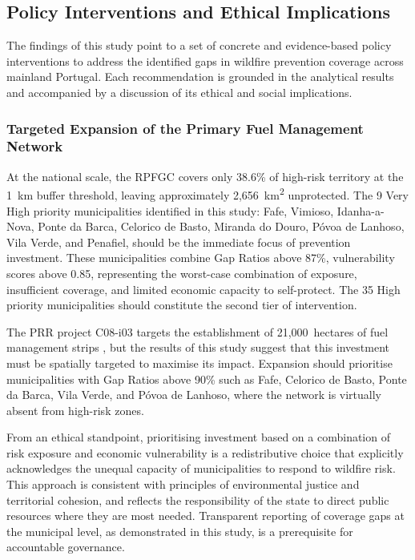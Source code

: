 \subsection{Policy Interventions and Ethical Implications}

The findings of this study point to a set of concrete and evidence-based
policy interventions to address the identified gaps in wildfire prevention
coverage across mainland Portugal. Each recommendation is grounded in the
analytical results and accompanied by a discussion of its ethical and
social implications.

\subsubsection*{Targeted Expansion of the Primary Fuel Management Network}

At the national scale, the RPFGC covers only 38.6\% of high-risk
territory at the 1~km buffer threshold, leaving approximately
2,656~km\textsuperscript{2} unprotected. The 9 Very High priority
municipalities identified in this study: Fafe, Vimioso,
Idanha-a-Nova, Ponte da Barca, Celorico de Basto, Miranda do Douro,
Póvoa de Lanhoso, Vila Verde, and Penafiel, should be the immediate
focus of prevention investment. These municipalities combine Gap Ratios
above 87\%, vulnerability scores above 0.85, representing the worst-case combination of
exposure, insufficient coverage, and limited economic capacity to
self-protect. The 35 High priority municipalities should constitute
the second tier of intervention.

The PRR project C08-i03 targets the establishment of 21,000~hectares
of fuel management strips \cite{Transparencia_C08}, but the results
of this study suggest that this investment must be spatially targeted
to maximise its impact. Expansion should prioritise municipalities
with Gap Ratios above 90\% such as Fafe, Celorico de Basto, Ponte
da Barca, Vila Verde, and Póvoa de Lanhoso, where the network is
virtually absent from high-risk zones.

From an ethical standpoint, prioritising investment based on a
combination of risk exposure and economic vulnerability is a
redistributive choice that explicitly acknowledges the unequal
capacity of municipalities to respond to wildfire risk. This approach
is consistent with principles of environmental justice and territorial
cohesion, and reflects the responsibility of the state to direct
public resources where they are most needed. Transparent reporting
of coverage gaps at the municipal level, as demonstrated in this
study, is a prerequisite for accountable governance.

